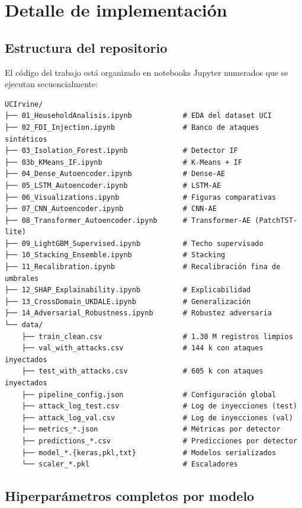 \chapter{Detalle de implementación}
\label{anx:implementacion}

\section{Estructura del repositorio}

El código del trabajo está organizado en notebooks Jupyter numerados que se ejecutan secuencialmente:

\begin{verbatim}
UCIrvine/
├── 01_HouseholdAnalisis.ipynb            # EDA del dataset UCI
├── 02_FDI_Injection.ipynb                # Banco de ataques sintéticos
├── 03_Isolation_Forest.ipynb             # Detector IF
├── 03b_KMeans_IF.ipynb                   # K-Means + IF
├── 04_Dense_Autoencoder.ipynb            # Dense-AE
├── 05_LSTM_Autoencoder.ipynb             # LSTM-AE
├── 06_Visualizations.ipynb               # Figuras comparativas
├── 07_CNN_Autoencoder.ipynb              # CNN-AE
├── 08_Transformer_Autoencoder.ipynb      # Transformer-AE (PatchTST-lite)
├── 09_LightGBM_Supervised.ipynb          # Techo supervisado
├── 10_Stacking_Ensemble.ipynb            # Stacking
├── 11_Recalibration.ipynb                # Recalibración fina de umbrales
├── 12_SHAP_Explainability.ipynb          # Explicabilidad
├── 13_CrossDomain_UKDALE.ipynb           # Generalización
├── 14_Adversarial_Robustness.ipynb       # Robustez adversaria
└── data/
    ├── train_clean.csv                   # 1.30 M registros limpios
    ├── val_with_attacks.csv              # 144 k con ataques inyectados
    ├── test_with_attacks.csv             # 605 k con ataques inyectados
    ├── pipeline_config.json              # Configuración global
    ├── attack_log_test.csv               # Log de inyecciones (test)
    ├── attack_log_val.csv                # Log de inyecciones (val)
    ├── metrics_*.json                    # Métricas por detector
    ├── predictions_*.csv                 # Predicciones por detector
    ├── model_*.{keras,pkl,txt}           # Modelos serializados
    └── scaler_*.pkl                      # Escaladores
\end{verbatim}

\section{Hiperparámetros completos por modelo}

